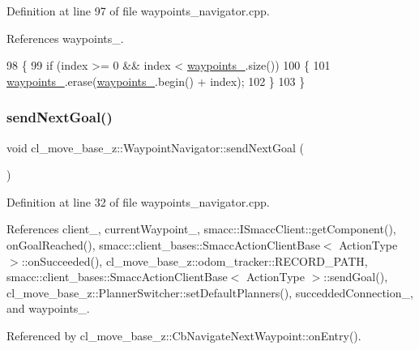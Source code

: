 Definition at line 97 of file waypoints\+\_\+navigator.\+cpp.



References waypoints\+\_\+.


\begin{DoxyCode}
98 \{
99   \textcolor{keywordflow}{if} (index >= 0 && index < \hyperlink{classcl__move__base__z_1_1WaypointNavigator_a727f6a73e15ff5dc6bb3ffdf52c3d832}{waypoints\_}.size())
100   \{
101     \hyperlink{classcl__move__base__z_1_1WaypointNavigator_a727f6a73e15ff5dc6bb3ffdf52c3d832}{waypoints\_}.erase(\hyperlink{classcl__move__base__z_1_1WaypointNavigator_a727f6a73e15ff5dc6bb3ffdf52c3d832}{waypoints\_}.begin() + index);
102   \}
103 \}
\end{DoxyCode}
\mbox{\label{classcl__move__base__z_1_1WaypointNavigator_a1e0a8ff536d2d01a01063fd903029347}} 
\subsubsection{\texorpdfstring{send\+Next\+Goal()}{sendNextGoal()}}
{\footnotesize\ttfamily void cl\+\_\+move\+\_\+base\+\_\+z\+::\+Waypoint\+Navigator\+::send\+Next\+Goal (\begin{DoxyParamCaption}{ }\end{DoxyParamCaption})}



Definition at line 32 of file waypoints\+\_\+navigator.\+cpp.



References client\+\_\+, current\+Waypoint\+\_\+, smacc\+::\+I\+Smacc\+Client\+::get\+Component(), on\+Goal\+Reached(), smacc\+::client\+\_\+bases\+::\+Smacc\+Action\+Client\+Base$<$ Action\+Type $>$\+::on\+Succeeded(), cl\+\_\+move\+\_\+base\+\_\+z\+::odom\+\_\+tracker\+::\+R\+E\+C\+O\+R\+D\+\_\+\+P\+A\+TH, smacc\+::client\+\_\+bases\+::\+Smacc\+Action\+Client\+Base$<$ Action\+Type $>$\+::send\+Goal(), cl\+\_\+move\+\_\+base\+\_\+z\+::\+Planner\+Switcher\+::set\+Default\+Planners(), succedded\+Connection\+\_\+, and waypoints\+\_\+.



Referenced by cl\+\_\+move\+\_\+base\+\_\+z\+::\+Cb\+Navigate\+Next\+Waypoint\+::on\+Entry().


